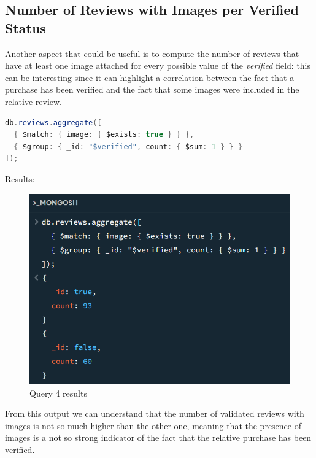 \subsection{Number of Reviews with Images per Verified Status}
Another aspect that could be useful is to compute the number of reviews that have at least one image attached for every possible value of the \textit{verified} field: this can be interesting since it can highlight a correlation between the fact that a purchase has been verified and the fact that some images were included in the relative review. \\
\begin{lstlisting}[language=Java]
db.reviews.aggregate([
  { $match: { image: { $exists: true } } },
  { $group: { _id: "$verified", count: { $sum: 1 } } }
]);
\end{lstlisting}
Results:
\begin{figure}[H]
  \centering
  \includegraphics[scale=1]{Images/q4_result.png}
  \caption{Query 4 results}
  \label{fig:q4_result}
\end{figure}
From this output we can understand that the number of validated reviews with images is not so much higher than the other one, meaning that the presence of images is a not so strong indicator of the fact that the relative purchase has been verified. \\